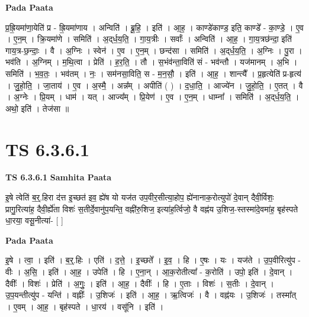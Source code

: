 \documentclass[17pt]{extarticle}
\begin{document}
\textbf{Pada Paata} \newline

प्र॒ह्रि॒यमा॑णा॒येति॑ प्र - ह्रि॒यमा॑णाय । अन्विति॑ । ब्रू॒हि॒ । इति॑ । आ॒ह॒ । काण्डे॑काण्ड॒ इति॒ काण्डे᳚ - का॒ण्डे॒ । ए॒व । ए॒न॒म् । क्रि॒यमा॑णे । समिति॑ । अ॒द्‌र्ध॒य॒ति॒ । गा॒य॒त्रीः । सर्वाः᳚ । अन्विति॑ । आ॒ह॒ । गा॒य॒त्रछ॑न्दा॒ इति॑ गाय॒त्र-छ॒न्दाः॒ । वै । अ॒ग्निः । स्वेन॑ । ए॒व । ए॒न॒म् । छन्द॑सा । समिति॑ । अ॒द्‌र्ध॒य॒ति॒ । अ॒ग्निः । पु॒रा । भव॑ति । अ॒ग्निम् । म॒थि॒त्वा । प्रेति॑ । ह॒र॒ति॒ । तौ । स॒भंव॑न्ता॒विति॑ सं - भव॑न्तौ । यज॑मानम् । अ॒भि । समिति॑ । भ॒व॒तः॒ । भव॑तम् । नः॒ । सम॑नसा॒विति॒ स - म॒न॒सौ॒ । इति॑ । आ॒ह॒ । शान्त्यै᳚ । प्र॒हृत्येति॑ प्र-हृत्य॑ । जु॒हो॒ति॒ । जा॒ताय॑ । ए॒व । अ॒स्मै॒ । अन्न᳚म् । अपीति॑ ( ) । द॒धा॒ति॒ । आज्ये॑न । जु॒हो॒ति॒ । ए॒तत् । वै । अ॒ग्नेः । प्रि॒यम् । धाम॑ । यत् । आज्य᳚म् । प्रि॒येण॑ । ए॒व । ए॒न॒म् । धाम्ना᳚ । समिति॑ । अ॒द्‌र्ध॒य॒ति॒ । अथो॒ इति॑ । तेज॑सा ॥  \newline





\section{ TS 6.3.6.1 }

\textbf{TS 6.3.6.1 } \newline
\textbf{Samhita Paata} \newline

इ॒षे त्वेति॑ ब॒र्॒.हिरा द॑त्त इ॒च्छत॑ इव॒ ह्ये॑ष यो यज॑त उप॒वीर॒सीत्या॒होप॒ ह्ये॑नानाक॒रोत्युपो॑ दे॒वान् दैवी॒र्विशः॒ प्रागु॒रित्या॑ह॒ दैवी॒र्ह्ये॑ता विशः॑ स॒तीर्दे॒वानु॑प॒यन्ति॒ वह्नी॑रु॒शिज॒ इत्या॑ह॒र्त्विजो॒ वै वह्न॑य उ॒शिज॒-स्तस्मा॑दे॒वमा॑ह॒ बृह॑स्पते धा॒रया॒ वसू॒नीत्या॑- [  ] \newline

\textbf{Pada Paata} \newline

इ॒षे । त्वा॒ । इति॑ । ब॒र्॒.हिः । एति॑ । द॒त्ते॒ । इ॒च्छते᳚ । इ॒व॒ । हि । ए॒षः । यः । यज॑ते । उ॒प॒वीरित्यु॑प - वीः । अ॒सि॒ । इति॑ । आ॒ह॒ । उपेति॑ । हि । ए॒ना॒न् । आ॒क॒रोतीत्या᳚ - क॒रोति॑ । उपो॒ इति॑ । दे॒वान् । दैवीः᳚ । विशः॑ । प्रेति॑ । अ॒गुः॒ । इति॑ । आ॒ह॒ । दैवीः᳚ । हि । ए॒ताः । विशः॑ । स॒तीः । दे॒वान् । उ॒प॒यन्तीत्यु॑प - यन्ति॑ । वह्नीः᳚ । उ॒शिजः॑ । इति॑ । आ॒ह॒ । ऋ॒त्विजः॑ । वै । वह्न॑यः । उ॒शिजः॑ । तस्मा᳚त् । ए॒वम् । आ॒ह॒ । बृह॑स्पते । धा॒रय॑ । वसू॑नि । इति॑ ।  \newline
\end{document}

